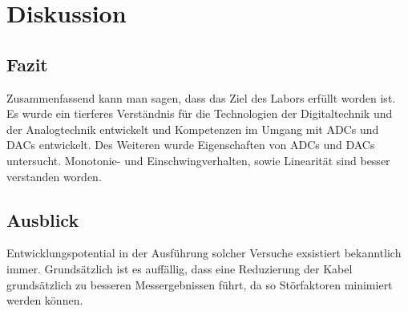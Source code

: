 \chapter{Diskussion}
\section{Fazit}
Zusammenfassend kann man sagen, dass das Ziel des Labors
erfüllt worden ist. Es wurde ein tierferes Verständnis für
die Technologien der Digitaltechnik und der Analogtechnik
entwickelt und Kompetenzen im Umgang mit ADCs und DACs entwickelt.
Des Weiteren wurde Eigenschaften von ADCs und DACs untersucht.
Monotonie- und Einschwingverhalten, sowie Linearität
sind besser verstanden worden.

\section{Ausblick}

Entwicklungspotential in der Ausführung solcher Versuche exsistiert
bekanntlich immer. Grundsätzlich ist es auffällig, dass
eine Reduzierung der Kabel grundsätzlich zu besseren Messergebnissen
führt, da so Störfaktoren minimiert werden können.